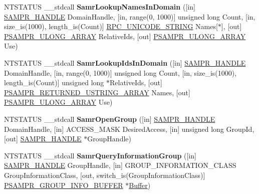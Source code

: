 \begin{DoxyCompactItemize}
\item 
\mbox{\label{interfacesamr_a7fdf04293a1433eaa73ad6ca99acff14}} 
N\+T\+S\+T\+A\+T\+US \+\_\+\+\_\+stdcall {\bfseries Samr\+Lookup\+Names\+In\+Domain} (\mbox{[}in\mbox{]} \hyperlink{interfacevoid}{S\+A\+M\+P\+R\+\_\+\+H\+A\+N\+D\+LE} Domain\+Handle, \mbox{[}in, range(0, 1000)\mbox{]} unsigned long Count, \mbox{[}in, size\+\_\+is(1000), length\+\_\+is(Count)\mbox{]} \hyperlink{struct___r_p_c___u_n_i_c_o_d_e___s_t_r_i_n_g}{R\+P\+C\+\_\+\+U\+N\+I\+C\+O\+D\+E\+\_\+\+S\+T\+R\+I\+NG} Names\mbox{[}$\ast$\mbox{]}, \mbox{[}out\mbox{]} \hyperlink{struct___s_a_m_p_r___u_l_o_n_g___a_r_r_a_y}{P\+S\+A\+M\+P\+R\+\_\+\+U\+L\+O\+N\+G\+\_\+\+A\+R\+R\+AY} Relative\+Ids, \mbox{[}out\mbox{]} \hyperlink{struct___s_a_m_p_r___u_l_o_n_g___a_r_r_a_y}{P\+S\+A\+M\+P\+R\+\_\+\+U\+L\+O\+N\+G\+\_\+\+A\+R\+R\+AY} Use)
\item 
\mbox{\label{interfacesamr_a2d7f647157c8cadef73b4f9fe1a7dbcb}} 
N\+T\+S\+T\+A\+T\+US \+\_\+\+\_\+stdcall {\bfseries Samr\+Lookup\+Ids\+In\+Domain} (\mbox{[}in\mbox{]} \hyperlink{interfacevoid}{S\+A\+M\+P\+R\+\_\+\+H\+A\+N\+D\+LE} Domain\+Handle, \mbox{[}in, range(0, 1000)\mbox{]} unsigned long Count, \mbox{[}in, size\+\_\+is(1000), length\+\_\+is(Count)\mbox{]} unsigned long $\ast$Relative\+Ids, \mbox{[}out\mbox{]} \hyperlink{struct___s_a_m_p_r___r_e_t_u_r_n_e_d___u_s_t_r_i_n_g___a_r_r_a_y}{P\+S\+A\+M\+P\+R\+\_\+\+R\+E\+T\+U\+R\+N\+E\+D\+\_\+\+U\+S\+T\+R\+I\+N\+G\+\_\+\+A\+R\+R\+AY} Names, \mbox{[}out\mbox{]} \hyperlink{struct___s_a_m_p_r___u_l_o_n_g___a_r_r_a_y}{P\+S\+A\+M\+P\+R\+\_\+\+U\+L\+O\+N\+G\+\_\+\+A\+R\+R\+AY} Use)
\item 
\mbox{\label{interfacesamr_a2b2129d3d7ed1340ea7aa2ae63124912}} 
N\+T\+S\+T\+A\+T\+US \+\_\+\+\_\+stdcall {\bfseries Samr\+Open\+Group} (\mbox{[}in\mbox{]} \hyperlink{interfacevoid}{S\+A\+M\+P\+R\+\_\+\+H\+A\+N\+D\+LE} Domain\+Handle, \mbox{[}in\mbox{]} A\+C\+C\+E\+S\+S\+\_\+\+M\+A\+SK Desired\+Access, \mbox{[}in\mbox{]} unsigned long Group\+Id, \mbox{[}out\mbox{]} \hyperlink{interfacevoid}{S\+A\+M\+P\+R\+\_\+\+H\+A\+N\+D\+LE} $\ast$Group\+Handle)
\item 
\mbox{\label{interfacesamr_a033f34be17346a998b32726167b1778b}} 
N\+T\+S\+T\+A\+T\+US \+\_\+\+\_\+stdcall {\bfseries Samr\+Query\+Information\+Group} (\mbox{[}in\mbox{]} \hyperlink{interfacevoid}{S\+A\+M\+P\+R\+\_\+\+H\+A\+N\+D\+LE} Group\+Handle, \mbox{[}in\mbox{]} G\+R\+O\+U\+P\+\_\+\+I\+N\+F\+O\+R\+M\+A\+T\+I\+O\+N\+\_\+\+C\+L\+A\+SS Group\+Information\+Class, \mbox{[}out, switch\+\_\+is(Group\+Information\+Class)\mbox{]} \hyperlink{union___s_a_m_p_r___g_r_o_u_p___i_n_f_o___b_u_f_f_e_r}{P\+S\+A\+M\+P\+R\+\_\+\+G\+R\+O\+U\+P\+\_\+\+I\+N\+F\+O\+\_\+\+B\+U\+F\+F\+ER} $\ast$\hyperlink{class_buffer}{Buffer})

\end{DoxyCompactItemize}
